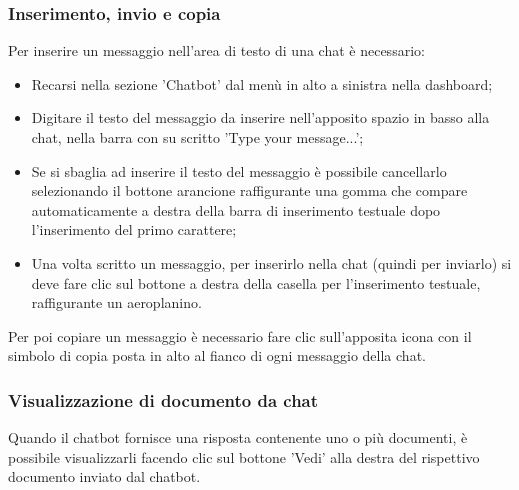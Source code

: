 \documentclass[10pt, a4paper]{article}
\begin{document}
\subsubsection{Inserimento, invio e copia}
Per inserire un messaggio nell'area di testo di una chat è necessario:
\begin{itemize}
    \item Recarsi nella sezione 'Chatbot' dal menù in alto a sinistra nella dashboard;
    \item Digitare il testo del messaggio da inserire nell'apposito spazio in basso alla chat, nella barra con su scritto 'Type your message...';
    \item Se si sbaglia ad inserire il testo del messaggio è possibile cancellarlo selezionando il bottone arancione raffigurante una gomma che compare automaticamente a destra della barra di inserimento testuale dopo l'inserimento del primo carattere;
    \item Una volta scritto un messaggio, per inserirlo nella chat (quindi per inviarlo) si deve fare clic sul bottone a destra della casella per l'inserimento testuale, raffigurante un aeroplanino.
\end{itemize}
Per poi copiare un messaggio è necessario fare clic sull'apposita icona con il simbolo di copia posta in alto al fianco di ogni messaggio della chat.
\subsubsection{Visualizzazione di documento da chat}
Quando il chatbot fornisce una risposta contenente uno o più documenti, è possibile visualizzarli facendo clic sul bottone 'Vedi' alla destra del rispettivo documento inviato dal chatbot.
\end{document}
